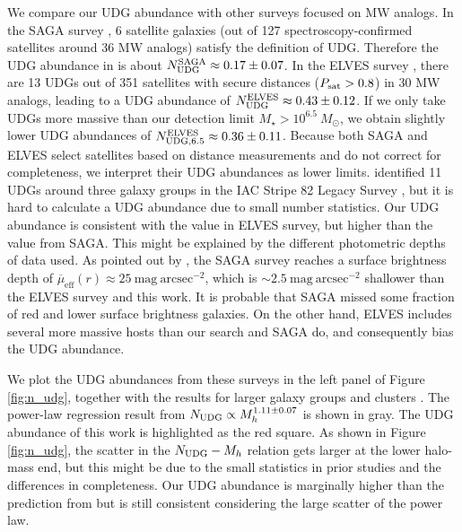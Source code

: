 \documentclass[twocolumn,astrosymb,twocolappendix]{aastex631}
\newcommand{\sbunit}{\mathrm{mag\ arcsec}^{-2}}
\newcommand{\sbeffr}{\overline{\mu}_{\mathrm{eff}}(r)}
\begin{document}
\begin{CJK*}{UTF8}{gbsn}
We compare our UDG abundance with other surveys focused on MW analogs. In the SAGA survey \citep{SAGA-II}, 6 satellite galaxies (out of 127 spectroscopy-confirmed satellites around 36 MW analogs) satisfy the definition of UDG. Therefore the UDG abundance in \citet{SAGA-II} is about $N_{\rm UDG}^{\rm SAGA}\approx 0.17\pm0.07$. In the ELVES survey \citep{CarlstenELVES2022}, there are 13 UDGs out of 351 satellites with secure distances ($P_{\rm sat} > 0.8$) in 30 MW analogs, leading to a UDG abundance of $N_{\rm UDG}^{\rm ELVES} \approx 0.43\pm0.12$. If we only take UDGs more massive than our detection limit $M_\star > 10^{6.5}\ M_\odot$, we obtain slightly lower UDG abundances of $N_{\rm UDG, 6.5}^{\rm ELVES} \approx 0.36\pm0.11$. Because both SAGA and ELVES select satellites based on distance measurements and do not correct for completeness, we interpret their UDG abundances as lower limits. \citet{Roman2017b} identified 11 UDGs around three galaxy groups in the IAC Stripe 82 Legacy Survey \citep{Fliri2016}, but it is hard to calculate a UDG abundance due to small number statistics. Our UDG abundance is consistent with the value in ELVES survey, but higher than the value from SAGA. This might be explained by the different photometric depths of data used. As pointed out by \citet{CarlstenELVES2022,Font2022}, the SAGA survey reaches a surface brightness depth of $\sbeffr\approx 25\ \sbunit$, which is $\sim 2.5\ \sbunit$ shallower than the ELVES survey and this work. It is probable that SAGA missed some fraction of red and lower surface brightness galaxies. On the other hand, ELVES includes several more massive hosts than our search and SAGA do, and consequently bias the UDG abundance.


We plot the UDG abundances from these surveys in the left panel of Figure \ref{fig:n_udg}, together with the results for larger galaxy groups and clusters \citep{Koda2015,Munoz2015,Roman2017a,Roman2017b,Janssens2017,vdBurg2017}. 
The power-law regression result from \citet{vdBurg2017} $N_{\rm UDG} \propto M_h^{1.11\pm 0.07}$ is shown in gray. The UDG abundance of this work is highlighted as the red square. As shown in Figure \ref{fig:n_udg}, the scatter in the $N_{\rm UDG}-M_h$ relation gets larger at the lower halo-mass end, but this might be due to the small statistics in prior studies and the differences in completeness. Our UDG abundance is marginally higher than the prediction from \citet{vdBurg2017} but is still consistent considering the large scatter of the power law. 


\end{CJK*}
\end{document}
